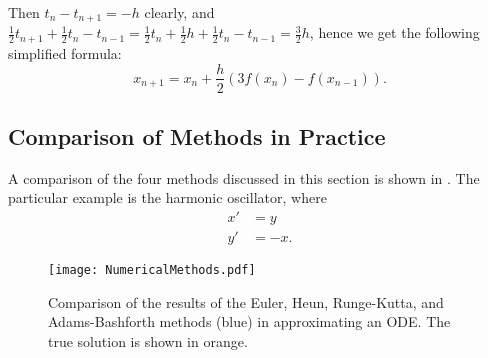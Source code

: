 Then $t_n - t_{n+1} = -h$ clearly, and $\frac12 t_{n+1} + \frac12 t_n - t_{n-1} = \frac12 t_n + \frac12 h + \frac12 t_n - t_{n-1} = \frac32 h$, hence we get the following simplified formula:
\begin{equation}
	x_{n+1} = x_n + \frac{h}{2}\left(3f(x_n) - f(x_{n-1})\right).
\end{equation}

\vfill
\pagebreak
\subsection{Comparison of Methods in Practice}

A comparison of the four methods discussed in this section is shown in . The particular example is the harmonic oscillator, where
\begin{align*}
	x' &= y \\
	y' &= -x.
\end{align*}

\begin{figure}[!ht]
	\centering
	\texttt{[image: NumericalMethods.pdf]}
	\caption{Comparison of the results of the Euler, Heun, Runge-Kutta, and Adams-Bashforth methods (blue) in approximating an ODE. The true solution is shown in orange.}
	\label{fig:numericals}
\end{figure}
